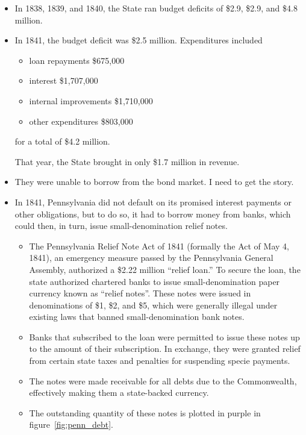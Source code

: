\documentclass[11pt]{article}
\begin{document}
\begin{itemize}

\item In 1838, 1839, and 1840, the State ran budget deficits of \$2.9, \$2.9, and \$4.8 million.

\item In 1841, the budget deficit was \$2.5 million.  Expenditures included  
\begin{itemize}
\item loan repayments \$675,000
\item interest \$1,707,000
\item internal improvements \$1,710,000
\item other expenditures \$803,000
\end{itemize}
for a total of \$4.2 million.

That year, the State brought in only \$1.7 million in revenue.

\item They were unable to borrow from the bond market.  I need to get the story.

\item In 1841, Pennsylvania did not default on its promised interest payments or other 
obligations, but to do so, it had to borrow money from banks, which could then, 
in turn, issue small-denomination relief notes.

\begin{itemize}

\item The Pennsylvania Relief Note Act of 1841 (formally the Act of May 4, 
1841), an emergency measure passed by the Pennsylvania General Assembly, 
authorized a \$2.22 million ``relief loan.''  To secure the loan, the state 
authorized chartered banks to issue small-denomination paper currency known 
as ``relief notes''. These notes were issued in denominations of \$1, \$2, 
and \$5, which were generally illegal under existing laws that banned 
small-denomination bank notes.

\item Banks that subscribed to the loan were permitted to issue these notes 
up to the amount of their subscription. In exchange, they were granted relief 
from certain state taxes and penalties for suspending specie payments. 

\item The notes were made receivable for all debts due to the Commonwealth, 
effectively making them a state-backed currency.

\item The outstanding quantity of these notes is plotted in purple in figure~\ref{fig:penn_debt}.

\end{itemize}
\end{itemize}
\end{document}
